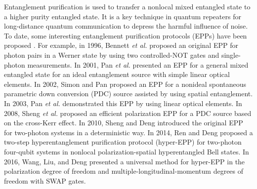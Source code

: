 \documentclass[showpacs,aps,graphicx,twocolumn]{revtex4}
\begin{document}
Entanglement purification is used to transfer a nonlocal mixed
entangled state to a higher purity entangled state. It is a key
technique in quantum repeaters for long-distance quantum
communication to depress the  harmful influence of noise. To date,
some interesting entanglement purification protocols (EPPs) have been
proposed
\cite{EPP1,DDeutschPRL1996,JWPannature2001,Simon2002,JWPannature2003,YBShengPRA2008,
EPP2,EPP3,EPP4,dengonestep,EPP5,GYWangPRA2016,CWangECPPRA11,EPPadd1,EPPadd2}.
For example,  in 1996, Bennett \emph{et al.} \cite{EPP1} proposed an
original EPP for photon pairs in a Werner state
\cite{RFWernerPRA1989} by using two controlled-NOT gates and
single-photon measurements.  In 2001, Pan \emph{et al.}
\cite{JWPannature2001} presented an EPP for a general mixed
entangled state for an ideal entanglement source with simple linear
optical elements. In 2002, Simon and Pan \cite{Simon2002} proposed
an EPP for a nonideal spontaneous parametric down conversion (PDC)
source assisted by using spatial entanglement. In 2003, Pan \emph{et
al.} \cite{JWPannature2003} demonstrated this EPP by using linear
optical elements. In 2008, Sheng \emph{et al.} \cite{YBShengPRA2008}
proposed an efficient polarization EPP for a PDC  source based on the
cross-Kerr effect. In 2010, Sheng and Deng \cite{EPP2} introduced
the original EPP for two-photon systems in a deterministic way.  In
2014, Ren and Deng \cite{EPP5} proposed a two-step hyperentanglement
purification protocol (hyper-EPP) for two-photon four-qubit systems
in nonlocal polarization-spatial hyperentangled Bell states. In
2016, Wang, Liu, and Deng \cite{GYWangPRA2016} presented a universal
method for hyper-EPP in the polarization degree
of freedom and
multiple-longitudinal-momentum degrees of freedom with SWAP gates.
\end{document}
